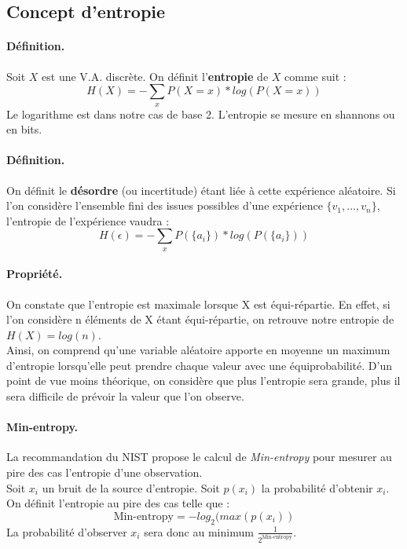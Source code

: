\subsection{Concept d'entropie}
\paragraph{Définition.\\}
Soit $X$ est une V.A. discrète. On définit l'\textbf{entropie} de $X$ comme suit : 
$$H(X) = - \sum_x P(X=x)*log(P(X=x))	 $$ 
Le logarithme est dans notre cas de base 2. L'entropie se mesure en shannons ou en bits.\\

\paragraph{Définition.\\}
On définit le \textbf{désordre} (ou incertitude) étant liée à cette expérience aléatoire. Si l'on considère l'ensemble fini des issues possibles d'une expérience $\lbrace v_1,...,v_n \rbrace$, l'entropie de l'expérience vaudra :
$$H(\epsilon) = - \sum_x P(\lbrace a_i \rbrace)*log(P(\lbrace a_i \rbrace))	 $$ 

\paragraph{Propriété.\\} 
On constate que l'entropie est maximale lorsque X est équi-répartie. En effet, si l'on considère n éléments de X étant équi-répartie, on retrouve notre entropie de $H(X) = log(n)$. \\


Ainsi, on comprend qu'une variable aléatoire apporte en moyenne un maximum d'entropie lorsqu'elle peut prendre chaque valeur avec une équiprobabilité. D'un point de vue moins théorique, on considère que plus l'entropie sera grande, plus il sera difficile de prévoir la valeur que l'on observe.

\paragraph{Min-entropy.\\}
La recommandation du NIST propose le calcul de \textit{Min-entropy} pour mesurer au pire des cas l'entropie d'une observation. \\

Soit $x_i$ un bruit de la source d'entropie. Soit $p(x_i)$ la probabilité d'obtenir $x_i$. On définit l'entropie au pire des cas telle que : 
$$\text{Min-entropy}=-log_2(max(p(x_i))$$
La probabilité d'observer $x_i$ sera donc au minimum $\frac{1}{2^\text{Min-entropy}}$.

